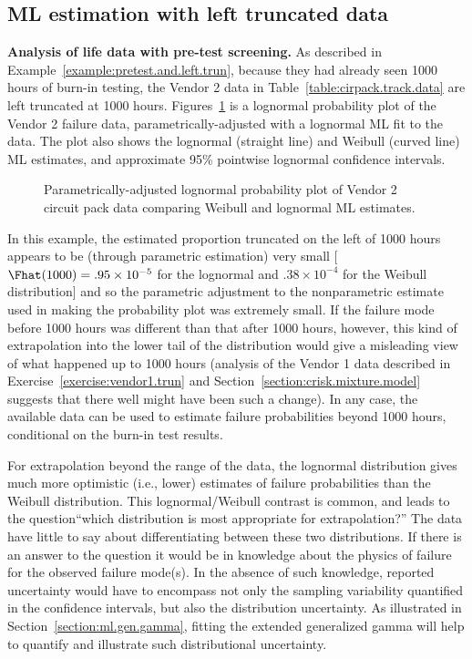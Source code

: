 \subsection{ML estimation with left truncated data}
\begin{example}
\label{example:pretest.mle}
{\bf Analysis of life data with pre-test screening.} As described in
Example~\ref{example:pretest.and.left.trun}, because they had already
seen 1000 hours of burn-in testing, the Vendor 2 data in
Table~\ref{table:cirpack.track.data} are left truncated at 1000 hours.
Figures~\ref{figure:cirpak6.cfmleprobplot.lnor.weib.ps} is a lognormal
probability plot of the Vendor 2 failure data,
parametrically-adjusted with a lognormal ML fit to the data.
The plot also shows the lognormal (straight line) and Weibull (curved
line) ML estimates, and approximate 95\% pointwise lognormal
confidence intervals.
\begin{figure}
\caption{Parametrically-adjusted lognormal probability plot of Vendor 2 
circuit pack data comparing Weibull and lognormal ML estimates.}
\label{figure:cirpak6.cfmleprobplot.lnor.weib.ps}
\end{figure}
In this example, the estimated proportion truncated on the left of
1000 hours appears to be (through parametric estimation) very
small [$\Fhat(1000) = .95\times 10^{-5}$ for the lognormal and
$.38\times 10^{-4}$ for the Weibull distribution] and so the
parametric adjustment to the nonparametric estimate used in making the
probability plot was extremely small. If the failure mode before 1000
hours was different than that after 1000 hours, however, this kind of
extrapolation into the lower tail of the distribution would give a
misleading view of what happened up to 1000 hours (analysis of the
Vendor 1 data described in Exercise~\ref{exercise:vendor1.trun} and
Section~\ref{section:crisk.mixture.model} suggests that there well
might have been such a change). In any case, the available data can be
used to estimate failure probabilities beyond 1000 hours, conditional
on the burn-in test results.

For extrapolation beyond the range of the data, the lognormal
distribution gives much more optimistic (i.e., lower) estimates of
failure probabilities than the Weibull distribution. This
lognormal/Weibull contrast is common, and leads to the
question``which distribution is most appropriate for
extrapolation?''  The data have little to say about differentiating
between these two distributions. If there is an answer to the
question it would be in knowledge about the physics of failure for
the observed failure mode(s). In the absence of such knowledge,
reported uncertainty would have to encompass not only the sampling
variability quantified in the confidence intervals, but also the
distribution uncertainty.  As illustrated in
Section~\ref{section:ml.gen.gamma}, fitting the extended generalized
gamma will help to quantify and illustrate such distributional
uncertainty.
\end{example}


